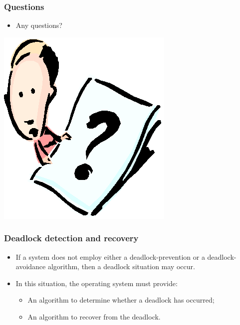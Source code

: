 \documentclass[CJKutf8,xcolor=pdftex,dvipsnames,table]{beamer}
\begin{document}
\begin{CJK*}{UTF8}{song}
  \begin{frame}
  \frametitle{Questions}
  \begin{itemize}
  \item{Any questions?}
  \end{itemize}
  \begin{center}
    \includegraphics[scale=.8]{question}
  \end{center}
  \end{frame}
  
  \begin{frame}
  \frametitle{Deadlock detection and recovery} \pause
  \begin{itemize}
  \item{If a system does not employ either a deadlock-prevention or a deadlock-avoidance algorithm, then a deadlock situation may occur.} \pause
  \item{In this situation, the operating system must provide:} \pause
    \begin{itemize}
    \item{An algorithm to determine whether a deadlock has occurred;} \pause
    \item{An algorithm to recover from the deadlock.}
    \end{itemize}
  \end{itemize}
  \end{frame}
  

\end{CJK*}
\end{document}
